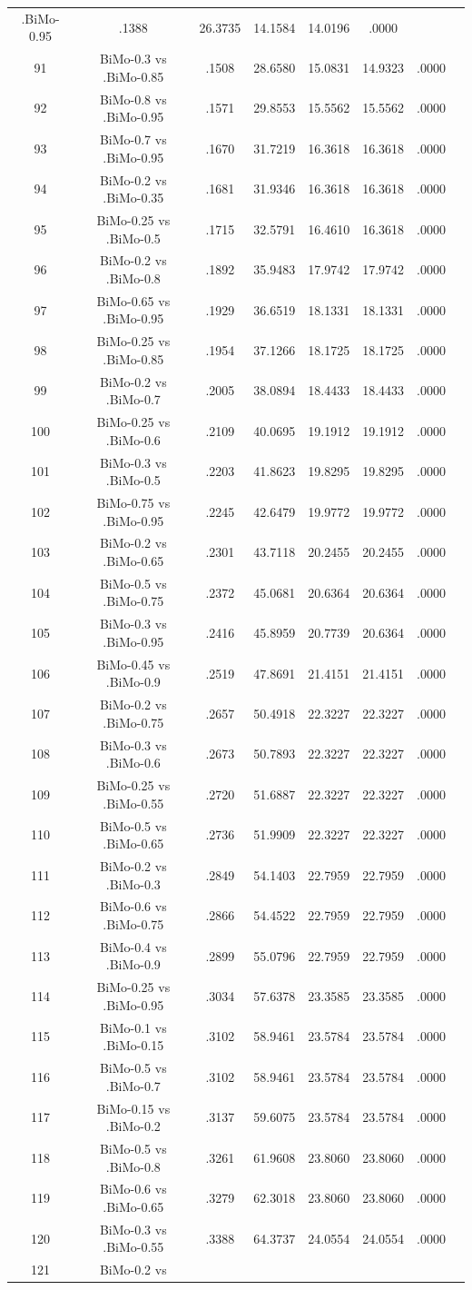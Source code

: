 \documentclass[a4paper,10pt]{article}
\begin{document}
\begin{landscape}
\begin{table}[!htp]
\begin{tabular}{cccccccc}
.BiMo-0.95&.1388&26.3735&14.1584&14.0196&.0000\\91&BiMo-0.3 vs .BiMo-0.85&.1508&28.6580&15.0831&14.9323&.0000\\92&BiMo-0.8 vs .BiMo-0.95&.1571&29.8553&15.5562&15.5562&.0000\\93&BiMo-0.7 vs .BiMo-0.95&.1670&31.7219&16.3618&16.3618&.0000\\94&BiMo-0.2 vs .BiMo-0.35&.1681&31.9346&16.3618&16.3618&.0000\\95&BiMo-0.25 vs .BiMo-0.5&.1715&32.5791&16.4610&16.3618&.0000\\96&BiMo-0.2 vs .BiMo-0.8&.1892&35.9483&17.9742&17.9742&.0000\\97&BiMo-0.65 vs .BiMo-0.95&.1929&36.6519&18.1331&18.1331&.0000\\98&BiMo-0.25 vs .BiMo-0.85&.1954&37.1266&18.1725&18.1725&.0000\\99&BiMo-0.2 vs .BiMo-0.7&.2005&38.0894&18.4433&18.4433&.0000\\100&BiMo-0.25 vs .BiMo-0.6&.2109&40.0695&19.1912&19.1912&.0000\\101&BiMo-0.3 vs .BiMo-0.5&.2203&41.8623&19.8295&19.8295&.0000\\102&BiMo-0.75 vs .BiMo-0.95&.2245&42.6479&19.9772&19.9772&.0000\\103&BiMo-0.2 vs .BiMo-0.65&.2301&43.7118&20.2455&20.2455&.0000\\104&BiMo-0.5 vs .BiMo-0.75&.2372&45.0681&20.6364&20.6364&.0000\\105&BiMo-0.3 vs .BiMo-0.95&.2416&45.8959&20.7739&20.6364&.0000\\106&BiMo-0.45 vs .BiMo-0.9&.2519&47.8691&21.4151&21.4151&.0000\\107&BiMo-0.2 vs .BiMo-0.75&.2657&50.4918&22.3227&22.3227&.0000\\108&BiMo-0.3 vs .BiMo-0.6&.2673&50.7893&22.3227&22.3227&.0000\\109&BiMo-0.25 vs .BiMo-0.55&.2720&51.6887&22.3227&22.3227&.0000\\110&BiMo-0.5 vs .BiMo-0.65&.2736&51.9909&22.3227&22.3227&.0000\\111&BiMo-0.2 vs .BiMo-0.3&.2849&54.1403&22.7959&22.7959&.0000\\112&BiMo-0.6 vs .BiMo-0.75&.2866&54.4522&22.7959&22.7959&.0000\\113&BiMo-0.4 vs .BiMo-0.9&.2899&55.0796&22.7959&22.7959&.0000\\114&BiMo-0.25 vs .BiMo-0.95&.3034&57.6378&23.3585&23.3585&.0000\\115&BiMo-0.1 vs .BiMo-0.15&.3102&58.9461&23.5784&23.5784&.0000\\116&BiMo-0.5 vs .BiMo-0.7&.3102&58.9461&23.5784&23.5784&.0000\\117&BiMo-0.15 vs .BiMo-0.2&.3137&59.6075&23.5784&23.5784&.0000\\118&BiMo-0.5 vs .BiMo-0.8&.3261&61.9608&23.8060&23.8060&.0000\\119&BiMo-0.6 vs .BiMo-0.65&.3279&62.3018&23.8060&23.8060&.0000\\120&BiMo-0.3 vs .BiMo-0.55&.3388&64.3737&24.0554&24.0554&.0000\\121&BiMo-0.2 vs 
\end{tabular}
\end{table}
\end{landscape}
\end{document}

